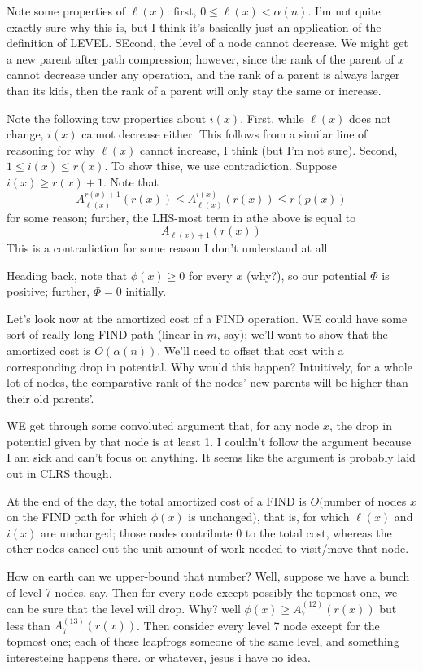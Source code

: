 \documentclass{article}
\begin{document}
Note some properties of $\ell(x)$: first, $0\leq \ell(x) < \alpha(n)$.
I'm not quite exactly sure why this is, but I think it's basically just an
application of the definition of LEVEL.
SEcond, the level of a node cannot decrease.
We might get a new parent after path compression; however, since the 
rank of the parent of $x$ cannot decrease under any operation, and the
rank of a parent is always larger than its kids, then the rank
of a parent will only stay the same or increase.

Note the following tow properties about $i(x)$. First, while $\ell(x)$
does not change, $i(x)$ cannot decrease either.
This follows from a similar line of reasoning for why $\ell(x)$ cannot 
increase,
I think (but I'm not sure).
Second, $1\leq i(x) \leq r(x)$. To show thise, we use contradiction.
Suppose $i(x) \geq r(x) + 1$.
Note that
$$
A_{\ell(x)}^{r(x) + 1}(r(x)) \leq A_{\ell(x)}^{i(x)}(r(x))
\leq
r(p(x))
$$
for some reason; further, the LHS-most term in athe above is equal to
$$
A_{\ell(x) + 1}(r(x))
$$
This is a contradiction for some reason I don't understand at all.

Heading back, note that $\phi(x) \geq 0$ for every $x$ (why?), so our
potential $\Phi$ is positive; further, $\Phi = 0$ initially.


Let's look now at the amortized cost of a FIND operation.
WE could have some sort of really long FIND path (linear in $m$, say); we'll
want to show that the amortized cost is $O(\alpha(n))$.
We'll need to offset that cost with a corresponding drop in potential.
Why would this happen?
Intuitively, for a whole lot of nodes, the comparative rank of the nodes'
new parents will be higher than their old parents'.

WE get through some convoluted argument that, for any node $x$, the drop in 
potential given by that node is at least 1. I couldn't follow the argument
because I am sick and can't focus on anything. It seems like
the argument is probably laid out in CLRS though.

At the end of the day, the total amortized cost of a FIND is
$O($number of nodes $x$ on the FIND path
for which $\phi(x)$ is unchanged$)$, that is, for which
$\ell(x)$ and $i(x)$ are unchanged; those nodes contribute 0 to the
total cost, whereas the other nodes cancel out the unit amount of work
needed to visit/move that node.

How on earth can we upper-bound that number?
Well, suppose we have a bunch of level 7  nodes, say.
Then for every node except possibly the topmost one, we can be sure
that the level will drop.
Why?
well $\phi(x) \geq A_7^{(12)}(r(x))$ but less than $A_7^{(13)}(r(x))$.
Then consider every level 7 node except for the topmost one; each of these
leapfrogs someone of the same level, and something interesteing happens there.
or whatever, jesus i have no idea.
\end{document}
